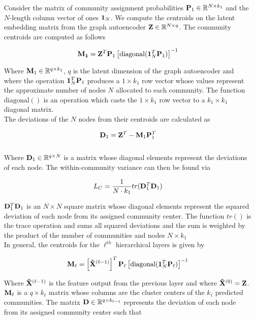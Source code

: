 \documentclass[a4paper,12pt]{article}
\begin{document}
\begin{itemize}
\begin{enumerate}
{{\begin{enumerate}
{					Consider the matrix of community assignment probabilities ${\bf P}_1\in \mathbb{R}^{N\times k_1}$ and the $N$-length column vector of ones ${\bf 1}_N$. We compute the centroids on the latent embedding matrix from the graph autoencoder ${\bf Z}\in \mathbb{R}^{N\times q}$. The community centroids are computed as follows
					
					\[ {\bf M_1} = {\bf Z}^T{\bf P}_1 \left[\text{diagonal}({\bf 1}_N^T {\bf P}_1)\right]^{-1}\]
					
					Where ${\bf M}_1 \in \mathbb{R}^{q\times k_1}$, $q$ is the latent dimension of the graph autoencoder and where the operation ${\bf 1}_N^T {\bf P}_1$ produces a $1 \times k_1$ row vector whose values represent the approximate number of nodes $N$ allocated to each community. The function $\text{diagonal}()$ is an operation which casts the $1 \times k_1$ row vector to a $k_1 \times k_1$ diagonal matrix. \\
					
					The deviations of the $N$ nodes from their centroids are calculated as 
					
					\[ {\bf D}_1 ={\bf Z}^T - {\bf M}_1{\bf P}_1^T \]\\
					
					Where ${\bf D}_1\in \mathbb{R}^{q\times N}$ is a matrix whose diagonal elements represent the deviations of each node. The within-community variance can then be found via
					
					\[L_C = \frac{1}{N \cdot k_1} tr({\bf D}_1^T {\bf D}_1)\]
					
					${\bf D}_1^T {\bf D}_1$ is an $N\times N$ square matrix whose diagonal elements represent the squared deviation of each node from its assigned community center. The function $tr()$ is the trace operation and sums all squared deviations and the sum is weighted by the product of the number of communities and nodes $N\times k_1$ \\
					
					In general, the centroids for the $\ell^{th}$ hierarchical layers is given by
					
					\[ {\bf M_\ell} = \left[{\bf \tilde X}^{(\ell-1)}\right]^T{\bf P}_\ell \left[\text{diagonal}({\bf 1}_N^T {\bf P}_\ell)\right]^{-1}\]
					
					Where ${\bf \tilde X}^{(\ell-1)}$ is the feature output from the previous layer and where ${\bf \tilde X}^{(0)} = {\bf Z}$. $\bf M_\ell$ is a $q\times k_\ell$ matrix whose columns are the cluster centers of the $k_\ell$ predicted communities. The matrix ${\bf D}\in\mathbb{R}^{q\times k_{\ell-1}}$ represents the deviation of each node from its assigned community center such that
					
}
\end{enumerate}}}
\end{enumerate}
\end{itemize}
\end{document}
